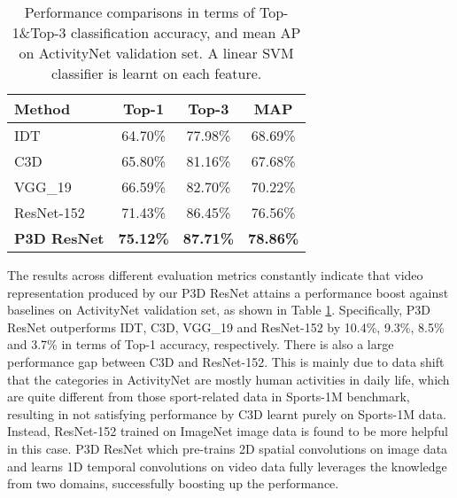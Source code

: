 \documentclass[10pt,twocolumn,letterpaper]{article}
\begin{document}
\begin{table}
\centering
\small
\caption{\small Performance comparisons in terms of Top-1\&Top-3 classification accuracy, and mean AP on ActivityNet validation set. A linear SVM classifier is learnt on each feature.}
\begin{tabular}{l|c|c|c} \hline
\textbf{Method}                                             & \textbf{Top-1} & \textbf{Top-3} & \textbf{MAP} \\ \hline
IDT \cite{wang2013action}                                   & 64.70\%        & 77.98\%        & 68.69\% \\
C3D \cite{tran2015learning}                                 & 65.80\%        & 81.16\%        & 67.68\% \\
VGG\_19 \cite{Simonyan:ICLR15}                              & 66.59\%        & 82.70\%        & 70.22\% \\
ResNet-152 \cite{he2015deep}                                & 71.43\%        & 86.45\%        & 76.56\% \\ \hline
\textbf{P3D ResNet}                                         & \textbf{75.12\%}        & \textbf{87.71\%}        & \textbf{78.86\%} \\ \hline
\end{tabular}
\label{tab:activitynet}
\vspace{-0.15in}
\end{table}


The results across different evaluation metrics constantly indicate that video representation produced by our P3D ResNet attains a performance boost against baselines on ActivityNet validation set, as shown in Table \ref{tab:activitynet}. Specifically, P3D ResNet outperforms IDT, C3D, VGG\_19 and ResNet-152 by 10.4\%, 9.3\%, 8.5\% and 3.7\% in terms of Top-1 accuracy, respectively. There is also a large performance gap between C3D and ResNet-152. This is mainly due to data shift that the categories in ActivityNet are mostly human activities in daily life, which are quite different from those sport-related data in Sports-1M benchmark, resulting in not satisfying performance by C3D learnt purely on Sports-1M data. Instead, ResNet-152 trained on ImageNet image data is found to be more helpful in this case. P3D ResNet which pre-trains 2D spatial convolutions on image data and learns 1D temporal convolutions on video data fully leverages the knowledge from two domains, successfully boosting up the performance.
\end{document}
